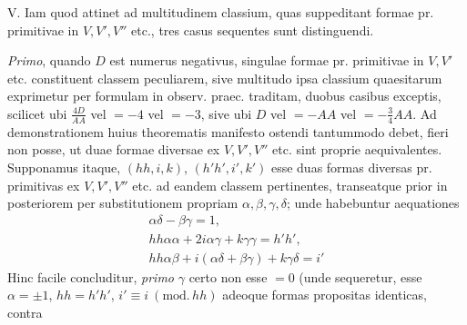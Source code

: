 V. Iam quod attinet ad multitudinem classium, quas suppeditant formae pr. primitivae in \(V,V',V''\) etc., tres casus sequentes sunt distinguendi.

\textit{Primo}, quando \(D\) est numerus negativus, singulae formae pr. primitivae in \(V,V'\) etc. constituent classem peculiarem, sive multitudo ipsa classium quaesitarum exprimetur per formulam in observ. praec. traditam, duobus casibus exceptis, scilicet ubi \(\frac{4D}{AA}\) vel \(=-4\) vel \(=-3\), sive ubi \(D\) vel \(=-AA\) vel \(=-\frac34 AA\). Ad demonstrationem huius theorematis manifesto ostendi tantummodo debet, fieri non posse, ut duae formae diversae ex \(V,V',V''\) etc. sint proprie aequivalentes. Supponamus itaque, \((hh,i,k)\), \((h'h',i',k')\) esse duas formas diversas pr. primitivas ex \(V,V',V''\) etc. ad eandem classem pertinentes, transeatque prior in posteriorem per substitutionem propriam \(\alpha,\beta,\gamma,\delta\); unde habebuntur aequationes
\[
\begin{gathered}\alpha\delta-\beta\gamma=1,\\ hh\alpha\alpha+2i\alpha\gamma+k\gamma\gamma=h'h',\\ hh\alpha\beta+i(\alpha\delta+\beta\gamma)+k\gamma\delta=i'\end{gathered}
\]
Hinc facile concluditur, \textit{primo} \(\gamma\) certo non esse \(=0\) (unde sequeretur, esse \(\alpha=\pm1\), \(hh=h'h'\), \(i'\equiv i\ (\mathrm{mod.}\,hh)\) adeoque formas propositas identicas, contra
